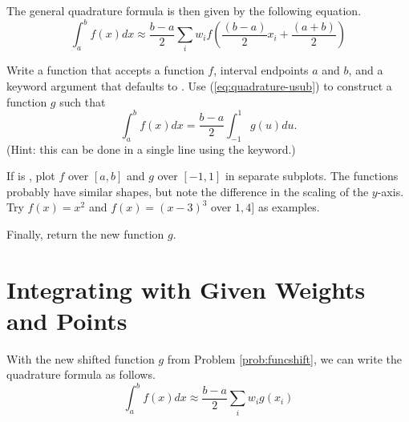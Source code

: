 The general quadrature formula is then given by the following equation.
\[
\int_a^b f(x) dx \approx \frac{b - a}{2} \sum_i w_i f\left(\frac{(b-a)}{2}x_i + \frac{(a+b)}{2}\right)
\]

\begin{problem} %
Write a function that accepts a function $f$, interval endpoints $a$ and $b$, and a keyword argument  that defaults to .
Use (\ref{eq:quadrature-usub}) to construct a function $g$ such that \[\int_a^b f(x)dx = \frac{b - a}{2}\int_{-1}^1 g(u)du.\]
(Hint: this can be done in a single line using the  keyword.)

If  is , plot $f$ over $[a,b]$ and $g$ over $[-1,1]$ in separate subplots.
The functions probably have similar shapes, but note the difference in the scaling of the $y$-axis.
Try $f(x) = x^2$ and $f(x) = (x - 3)^3$ over $1,4]$ as examples.

Finally, return the new function $g$.
\label{prob:funcshift}
\end{problem}

\begin{comment} %
As an example, let $f(x) = x^2$ on $[1,4]$.
We know that $\left.\int_1^4 x^2 dx = \frac{x^3}{3}\right|_1^4 = 21$.
Then setting
\begin{align*}
g(x) &= \frac{b - a}{2}f\left(\frac{b-a}{2}x + \frac{b+a}{2}\right) \\
& = \frac{3}{2}\left(\frac{3}{2}x + \frac{5}{2}\right)^2 \\
&= \frac{27}{8}x^2 + \frac{45}{8}x + \frac{75}{8},
\end{align*}
the interval-adjusted integral of $f(x)$ is given by
\begin{align*}
\int_a^b f(x)dx = \int_{-1}^1 g(x)dx = \left.\frac{9}{8} x^3 + \frac{45}{4} x^2 + \frac{75}{8} x\right|_{-1}^1 = 21.
\end{align*}
\end{comment}

\section*{Integrating with Given Weights and Points} %

With the new shifted function $g$ from Problem \ref{prob:funcshift}, we can write the quadrature formula as follows.
\begin{equation}
\int_a^b f(x) dx \approx \frac{b - a}{2} \sum_i w_i g(x_i)
\label{eq:general-quadrature}
\end{equation}


